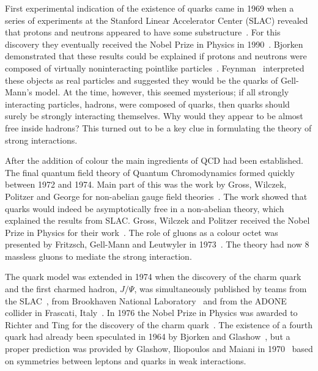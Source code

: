 First experimental indication of the existence of quarks came in 1969 when a series of experiments at the Stanford Linear Accelerator Center (SLAC) revealed that protons and neutrons appeared to have some substructure~\cite{Bloom:1969kcm, Breidenbach:1969kd}. For this discovery they eventually received the Nobel Prize in Physics in 1990~\cite{Nobel1990}. Bjorken demonstrated that these results could be explained if protons and neutrons were composed of virtually noninteracting pointlike particles~\cite{Bjorken:1968dy,Bjorken:1969ja}. Feynman~\cite{Feynman:1969ej} interpreted these objects as real particles and suggested they would be the quarks of Gell-Mann's model. At the time, however, this seemed mysterious; if all strongly interacting particles, hadrons, were composed of quarks, then quarks should surely be strongly interacting themselves. Why would they appear to be almost free inside hadrons? This turned out to be a key clue in formulating the theory of strong interactions.~\cite{Krauss:2017} 

After the addition of colour the main ingredients of QCD had been established. The final quantum field theory of Quantum Chromodynamics formed quickly between 1972 and 1974. Main part of this was the work by Gross, Wilczek, Politzer and George for non-abelian gauge field theories~\cite{gross1973ultraviolet, politzer1973reliable, gross1973asymptotically, gross1974asymptotically, georgi1974electroproduction}. The work showed that quarks would indeed be asymptotically free in a non-abelian theory, which explained the results from SLAC. Gross, Wilczek and Politzer received the Nobel Prize in Physics for their work~\cite{Nobel2004}. The role of gluons as a colour octet was presented by Fritzsch, Gell-Mann and Leutwyler in 1973~\cite{fritzsch1973advantages}. The theory had now 8 massless gluons to mediate the strong interaction.


The quark model was extended in 1974 when the discovery of the charm quark and the first charmed hadron, $J/\Psi$, was simultaneously published by teams from the SLAC~\cite{Augustin:1974xw}, from Brookhaven National Laboratory~\cite{Aubert:1974js} and from the ADONE collider in Frascati, Italy~\cite{Bacci:1974za}. In 1976 the Nobel Prize in Physics was awarded to Richter and Ting for the discovery of the charm quark~\cite{Nobel1976}. The existence of a fourth quark had already been speculated in 1964 by Bjorken and Glashow~\cite{Bjorken:1964gz}, but a proper prediction was provided by Glashow, Iliopoulos and Maiani in 1970~\cite{Glashow:1970gm} based on symmetries between leptons and quarks in weak interactions.

